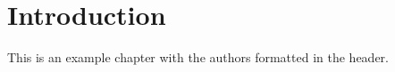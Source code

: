 \documentclass{article}
\begin{document}
\shortstack[l]
\chapter{Introduction}

This is an example chapter with the authors formatted in the header.
\end{document}
